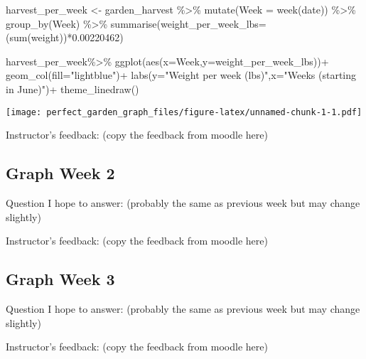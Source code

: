 \documentclass[
]{article}
\newenvironment{Shaded}{\begin{snugshade}}{\end{snugshade}}
\newcommand{\AttributeTok}[1]{\textcolor[rgb]{0.77,0.63,0.00}{#1}}
\newcommand{\FloatTok}[1]{\textcolor[rgb]{0.00,0.00,0.81}{#1}}
\newcommand{\FunctionTok}[1]{\textcolor[rgb]{0.00,0.00,0.00}{#1}}
\newcommand{\NormalTok}[1]{#1}
\newcommand{\OtherTok}[1]{\textcolor[rgb]{0.56,0.35,0.01}{#1}}
\newcommand{\SpecialCharTok}[1]{\textcolor[rgb]{0.00,0.00,0.00}{#1}}
\newcommand{\StringTok}[1]{\textcolor[rgb]{0.31,0.60,0.02}{#1}}
\begin{document}
\begin{Shaded}
\begin{Highlighting}[]
\NormalTok{harvest\_per\_week }\OtherTok{\textless{}{-}}\NormalTok{ garden\_harvest }\SpecialCharTok{\%\textgreater{}\%} 
  \FunctionTok{mutate}\NormalTok{(}\AttributeTok{Week =} \FunctionTok{week}\NormalTok{(date)) }\SpecialCharTok{\%\textgreater{}\%} 
  \FunctionTok{group\_by}\NormalTok{(Week) }\SpecialCharTok{\%\textgreater{}\%} 
  \FunctionTok{summarise}\NormalTok{(}\AttributeTok{weight\_per\_week\_lbs=}\NormalTok{ (}\FunctionTok{sum}\NormalTok{(weight))}\SpecialCharTok{*}\FloatTok{0.00220462}\NormalTok{) }

\NormalTok{harvest\_per\_week}\SpecialCharTok{\%\textgreater{}\%} 
  \FunctionTok{ggplot}\NormalTok{(}\FunctionTok{aes}\NormalTok{(}\AttributeTok{x=}\NormalTok{Week,}\AttributeTok{y=}\NormalTok{weight\_per\_week\_lbs))}\SpecialCharTok{+}
  \FunctionTok{geom\_col}\NormalTok{(}\AttributeTok{fill=}\StringTok{"lightblue"}\NormalTok{)}\SpecialCharTok{+}
  \FunctionTok{labs}\NormalTok{(}\AttributeTok{y=}\StringTok{"Weight per week (lbs)"}\NormalTok{,}\AttributeTok{x=}\StringTok{"Weeks (starting in June)"}\NormalTok{)}\SpecialCharTok{+}
  \FunctionTok{theme\_linedraw}\NormalTok{()}
\end{Highlighting}
\end{Shaded}

\texttt{[image: perfect\_garden\_graph\_files/figure-latex/unnamed-chunk-1-1.pdf]}

Instructor's feedback: (copy the feedback from moodle here)

\hypertarget{graph-week-2}{%
\subsection{Graph Week 2}\label{graph-week-2}}

Question I hope to answer: (probably the same as previous week but may
change slightly)

Instructor's feedback: (copy the feedback from moodle here)

\hypertarget{graph-week-3}{%
\subsection{Graph Week 3}\label{graph-week-3}}

Question I hope to answer: (probably the same as previous week but may
change slightly)

Instructor's feedback: (copy the feedback from moodle here)
\end{document}
